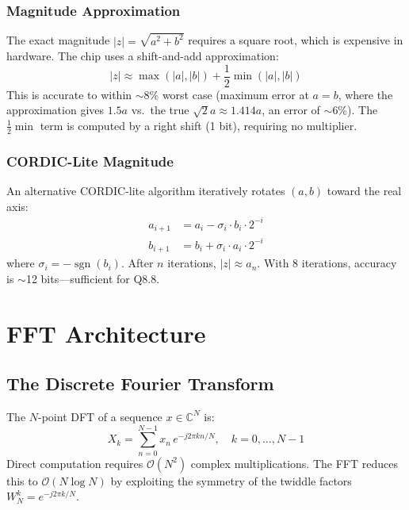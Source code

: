 \documentclass[11pt,a4paper]{article}
\theoremstyle{definition}
\theoremstyle{remark}
\newcommand{\C}{\mathbb{C}}
\newcommand{\abs}[1]{\left\lvert#1\right\rvert}
\newcommand{\sign}{\operatorname{sgn}}
\newcommand{\bigO}{\mathcal{O}}
\begin{document}
\subsubsection{Magnitude Approximation}
The exact magnitude $\abs{z} = \sqrt{a^2 + b^2}$ requires a square root, which is
expensive in hardware. The chip uses a shift-and-add approximation:
\begin{equation}
  \abs{z} \approx \max(\abs{a}, \abs{b}) + \frac{1}{2} \min(\abs{a}, \abs{b})
  \label{eq:mag_approx}
\end{equation}
This is accurate to within $\sim$8\% worst case (maximum error at $a = b$, where
the approximation gives $1.5a$ vs.\ the true $\sqrt{2}a \approx 1.414a$, an
error of $\sim$6\%). The $\frac{1}{2}\min$ term is computed by a right shift
(1 bit), requiring no multiplier.

\subsubsection{CORDIC-Lite Magnitude}
An alternative CORDIC-lite algorithm iteratively rotates $(a, b)$ toward the
real axis:
\begin{align}
  a_{i+1} &= a_i - \sigma_i \cdot b_i \cdot 2^{-i} \\
  b_{i+1} &= b_i + \sigma_i \cdot a_i \cdot 2^{-i}
\end{align}
where $\sigma_i = -\sign(b_i)$. After $n$ iterations, $\abs{z} \approx a_n$.
With 8 iterations, accuracy is $\sim$12 bits---sufficient for Q8.8.

\section{FFT Architecture}

\subsection{The Discrete Fourier Transform}

The $N$-point DFT of a sequence $x \in \C^N$ is:
\begin{equation}
  X_k = \sum_{n=0}^{N-1} x_n \, e^{-j 2\pi k n / N}, \quad k = 0, \ldots, N-1
  \label{eq:dft}
\end{equation}
Direct computation requires $\bigO(N^2)$ complex multiplications. The FFT reduces
this to $\bigO(N \log N)$ by exploiting the symmetry of the twiddle factors
$W_N^k = e^{-j 2\pi k / N}$.
\end{document}
